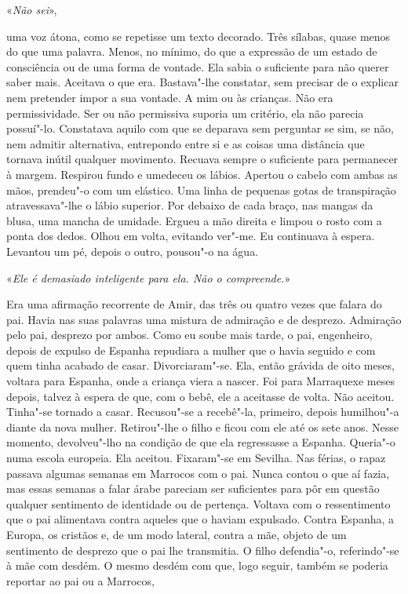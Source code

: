 «\emph{Não sei}»,

uma voz átona, como se repetisse um texto decorado. Três sílabas, quase
menos do que uma palavra. Menos, no mínimo, do que a expressão de um
estado de consciência ou de uma forma de vontade. Ela sabia o suficiente
para não querer saber mais. Aceitava o que era. Bastava"-lhe constatar,
sem precisar de o explicar nem pretender impor a sua vontade. A mim ou
às crianças. Não era permissividade. Ser ou não permissiva suporia um
critério, ela não parecia possuí"-lo. Constatava aquilo com que se
deparava sem perguntar se sim, se não, nem admitir alternativa,
entrepondo entre si e as coisas uma distância que tornava inútil
qualquer movimento. Recuava sempre o suficiente para permanecer à
margem. Respirou fundo e umedeceu os lábios. Apertou o cabelo com ambas
as mãos, prendeu"-o com um elástico. Uma linha de pequenas gotas de
transpiração atravessava"-lhe o lábio superior. Por debaixo de cada
braço, nas mangas da blusa, uma mancha de umidade. Ergueu a mão direita
e limpou o rosto com a ponta dos dedos. Olhou em volta, evitando
ver"-me. Eu continuava à espera. Levantou um pé, depois o outro,
pousou"-o na água.

«\emph{Ele é demasiado inteligente para ela. Não o compreende.}»

Era uma afirmação recorrente de Amir, das três ou quatro vezes que
falara do pai. Havia nas suas palavras uma mistura de admiração e de
desprezo. Admiração pelo pai, desprezo por ambos. Como eu soube mais
tarde, o pai, engenheiro, depois de expulso de Espanha repudiara a
mulher que o havia seguido e com quem tinha acabado de casar.
Divorciaram"-se. Ela, então grávida de oito meses, voltara para Espanha,
onde a criança viera a nascer. Foi para Marraquexe meses depois, talvez
à espera de que, com o bebê, ele a aceitasse de volta. Não aceitou.
Tinha"-se tornado a casar. Recusou"-se a recebê"-la, primeiro, depois
humilhou"-a diante da nova mulher. Retirou"-lhe o filho e ficou com ele
até os sete anos. Nesse momento, devolveu"-lho na condição de que ela
regressasse a Espanha. Queria"-o numa escola europeia. Ela aceitou.
Fixaram"-se em Sevilha. Nas férias, o rapaz passava algumas semanas em
Marrocos com o pai. Nunca contou o que aí fazia, mas essas semanas a
falar árabe pareciam ser suficientes para pôr em questão qualquer
sentimento de identidade ou de pertença. Voltava com o ressentimento que
o pai alimentava contra aqueles que o haviam expulsado. Contra Espanha,
a Europa, os cristãos e, de um modo lateral, contra a mãe, objeto de um
sentimento de desprezo que o pai lhe transmitia. O filho defendia"-o,
referindo"-se à mãe com desdém. O mesmo desdém com que, logo seguir,
também se poderia reportar ao pai ou a Marrocos,

